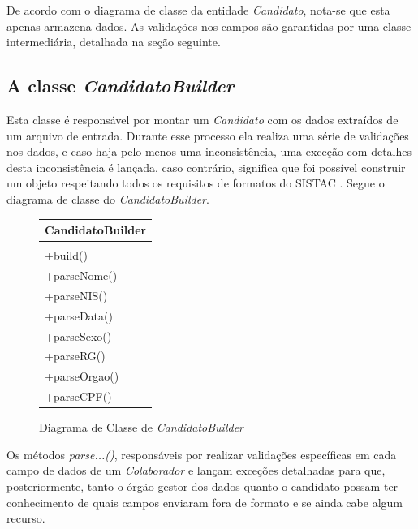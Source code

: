\documentclass[
	12pt,			%
	openright,		%
	oneside,	
	a4paper,		%
	english,		%
	brazil			%
]{abntex2/abntex2}  %
\begin{document}
				De acordo com o diagrama de classe da entidade \textit{Candidato}, nota-se que esta apenas armazena dados. As validações nos campos são garantidas por uma classe intermediária, detalhada na seção seguinte.
	
			\subsection{A classe \textit{CandidatoBuilder}} \label{candidato-builder}
				
				Esta classe é responsável por montar um \textit{Candidato} com os dados extraídos de um arquivo de entrada. Durante esse processo ela realiza uma série de validações nos dados, e caso haja pelo menos uma inconsistência, uma exceção com detalhes desta inconsistência é lançada, caso contrário, significa que foi possível construir um objeto respeitando todos os requisitos de formatos do SISTAC \cite{sistac-formatos}. Segue o diagrama de classe do \textit{CandidatoBuilder}.
				
				\begin{figure}[h]
					\begin{center}
						
						\caption{Diagrama de Classe de \textit{CandidatoBuilder}}
						\label{candidatobuilder-uml}
						
						\begin{tabular}{|l|}
							\hline
							\multicolumn{1}{|c|}{\textbf{CandidatoBuilder}} \\ \hline
							\\ \hline
							+build() \\
							+parseNome() \\
							+parseNIS() \\
							+parseData() \\
							+parseSexo() \\
							+parseRG() \\
							+parseOrgao() \\
							+parseCPF() \\ \hline
						\end{tabular}
					
					\end{center}
				\end{figure}
	
				Os métodos \textit{parse...()}, responsáveis por realizar validações específicas em cada campo de dados de um \textit{Colaborador} e lançam exceções detalhadas para que, posteriormente, tanto o órgão gestor dos dados quanto o candidato possam ter conhecimento de quais campos enviaram fora de formato e se ainda cabe algum recurso.
				
\end{document}

